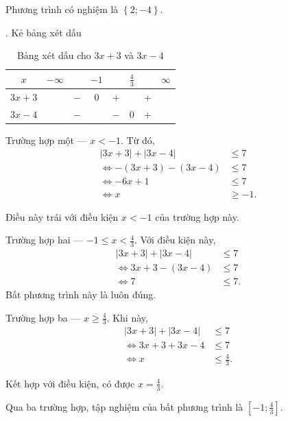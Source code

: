 Phương trình có nghiệm là $\left\{2; -4\right\}$.

. Kẻ bảng xét dấu

\begin{table}[H]
   \centering
   \begin{tabular}{|c|ccccccc|}
   \hline
   $x$          & $-\infty$ &     & $-1$ &     & $\frac{4}{3}$ &   & $\infty$ \\
   \hline
   $3x + 3$        &           & $-$ &  0  &  +  &     & + &           \\
   \hline
   $3x - 4$        &           & $-$ &     & $-$ &  0  & + &           \\
   \hline
   \end{tabular}
   \caption{Bảng xét dấu cho $3x + 3$ và $3x - 4$}
   \label{tab:nen_tang_lo_gich:ham_so_mot_bien:ham_tung_phan:gpt10}
\end{table}

\textcolor{colorEmphasisCyan}{Trường hợp một --- $x < -1$}. Từ đó,
\begin{align*}
   |3x + 3| + |3x - 4| &\leq 7 \\
   \iff -(3x + 3) - (3x - 4) &\leq 7 \\
   \iff -6x + 1 &\leq 7 \\
   \iff x &\geq -1.
\end{align*}

Điều này trái với điều kiện $x < -1$ của trường hợp này.

\textcolor{colorEmphasis}{Trường hợp hai --- $-1 \leq x < \frac{4}{3}$}. Với điều kiện này,
\begin{align*}
   |3x + 3| + |3x - 4| &\leq 7 \\
   \iff 3x + 3 - (3x - 4) &\leq 7 \\
   \iff 7 &\leq 7.
\end{align*}
Bất phương trình này là luôn đúng.

\textcolor{colorEmphasisGreen}{Trường hợp ba --- $x \geq \frac{4}{3}$}. Khi này,
\begin{align*}
   |3x + 3| + |3x - 4| &\leq 7 \\
   \iff 3x + 3 + 3x - 4 &\leq 7 \\
   \iff x &\leq \frac{4}{3}.
\end{align*}

Kết hợp với điều kiện, có được $x = \frac{4}{3}$.

Qua ba trường hợp, tập nghiệm của bất phương trình là $\left[-1; \frac{4}{3}\right]$.

